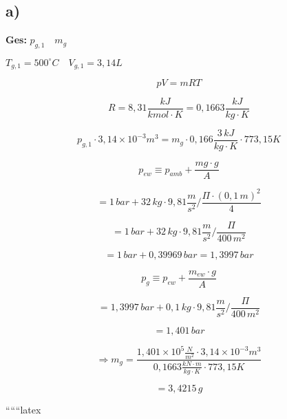 

\subsection*{a)}

\textbf{Ges:} \( p_{g,1} \quad m_g \)

\( T_{g,1} = 500^\circ C \quad V_{g,1} = 3,14L \)

\[
pV = mRT
\]

\[
R = 8,31 \frac{kJ}{kmol \cdot K} = 0,1663 \frac{kJ}{kg \cdot K}
\]

\[
p_{g,1} \cdot 3,14 \times 10^{-3} m^3 = m_g \cdot 0,166 \frac{3 \, kJ}{kg \cdot K} \cdot 773,15 K
\]

\[
p_{ew} \equiv p_{amb} + \frac{mg \cdot g}{A}
\]

\[
= 1 \, bar + 32 \, kg \cdot 9,81 \frac{m}{s^2} / \frac{\Pi \cdot (0,1 \, m)^2}{4}
\]

\[
= 1 \, bar + 32 \, kg \cdot 9,81 \frac{m}{s^2} / \frac{\Pi}{400 \, m^2}
\]

\[
= 1 \, bar + 0,39969 \, bar = 1,3997 \, bar
\]

\[
p_g \equiv p_{ew} + \frac{m_{ew} \cdot g}{A}
\]

\[
= 1,3997 \, bar + 0,1 \, kg \cdot 9,81 \frac{m}{s^2} / \frac{\Pi}{400 \, m^2}
\]

\[
= 1,401 \, bar
\]

\[
\Rightarrow m_g = \frac{1,401 \times 10^5 \frac{N}{m^2} \cdot 3,14 \times 10^{-3} m^3}{0,1663 \frac{kN \cdot m}{kg \cdot K} \cdot 773,15 K}
\]

\[
= 3,4215 \, g
\]

``````latex